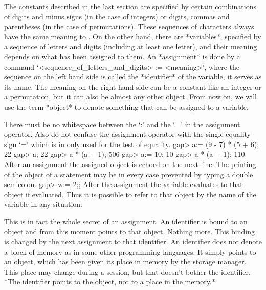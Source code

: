 \null

%
%
The  constants described  in the  last  section are  specified by certain
combinations   of digits and  minus  signs (in  the case  of integers) or
digits,  commas  and parentheses  (in   the case  of permutations). These
sequences of characters always  have the same meaning  to {\GAP}.  On the
other hand, there are *variables*, specified by a sequence of letters and
digits (including at least one letter), and their meaning depends on what
has been  assigned to them.  An *assignment* is  done by a {\GAP} command
`<sequence_of_letters_and_digits> := <meaning>',  where the  sequence  on
the left hand side is called the *identifier*  of the variable, it serves
as its name. The meaning on the right hand side can be a constant like an
integer or  a  permutation, but  it can  also be almost  any other {\GAP}
object. From now on,  we will use the  term *object* to denote  something
that can be assigned to a variable.

There must be no whitespace between the `:' and the `=' in the assignment
operator.  Also do not confuse  the  assignment operator with the  single
equality sign `=' which is in {\GAP} only used for the test of equality.
\beginexample
    gap> a:= (9 - 7) * (5 + 6);
    22
    gap> a;
    22
    gap> a * (a + 1);
    506
    gap> a:= 10;
    10
    gap> a * (a + 1);
    110 
\endexample
After an assignment the assigned object is echoed on the  next line.  The
printing of the  object of a statement may  be in every case prevented by
typing a double semicolon.
\beginexample
    gap> w:= 2;; 
\endexample
After the assignment the variable evaluates  to that object if evaluated.
Thus it is possible to  refer to that object by  the name of the variable
in any situation.

This is in fact the whole secret of an assignment. An identifier is bound
to an  object and from this moment  points to that object.  Nothing more.
This binding  is changed by the  next  assignment to that  identifier. An
identifier does not denote a block of memory as in some other programming
languages. It simply points to an object, which has  been given its place
in memory by the {\GAP} storage manager.   This place may change during a
{\GAP} session, but that doesn't  bother the identifier.  *The identifier
points to the object, not to a place in the memory.*

